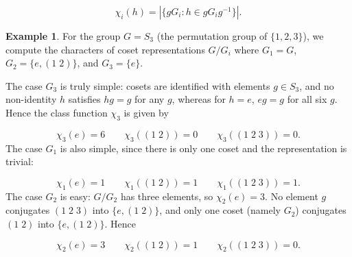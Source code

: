 \documentclass[12pt,titlepage]{article}
\theoremstyle{plain}
\theoremstyle{definition}
\newtheorem{example}{Example}
\theoremstyle{remark}
\begin{document}
\begin{displaymath}
\chi_i(h) = {|\{g G_i: h \in g G_i g^{-1}\}|}.
\end{displaymath}
\begin{example}
\label{}\hypertarget{}{}
For the group $G = S_3$ (the permutation group of $\{1, 2, 3\}$), we compute the characters of coset representations $G/G_i$ where $G_1 = G$, $G_2 = \{e, (1\; 2)\}$, and $G_3 = \{e\}$.

The case $G_3$ is truly simple: cosets are identified with elements $g \in S_3$, and no non-identity $h$ satisfies $h g = g$ for any $g$, whereas for $h = e$, $e g = g$ for all six $g$. Hence the class function $\chi_3$ is given by

\begin{displaymath}
\chi_3(e) = 6 \qquad \chi_3((1\; 2)) = 0 \qquad \chi_3((1\; 2\; 3)) = 0.
\end{displaymath}
The case $G_1$ is also simple, since there is only one coset and the representation is trivial:

\begin{displaymath}
\chi_1(e) = 1 \qquad \chi_1((1\; 2)) = 1 \qquad \chi_1((1\; 2\; 3)) = 1.
\end{displaymath}
The case $G_2$ is easy: $G/G_2$ has three elements, so $\chi_2(e) = 3$. No element $g$ conjugates $(1\; 2\; 3)$ into $\{e, (1\; 2)\}$, and only one coset (namely $G_2$) conjugates $(1\; 2)$ into $\{e, (1\; 2)\}$. Hence

\begin{displaymath}
\chi_2(e) = 3 \qquad \chi_2((1\; 2)) = 1 \qquad \chi_2((1\; 2\; 3)) = 0.
\end{displaymath}
\end{example}
\end{document}
